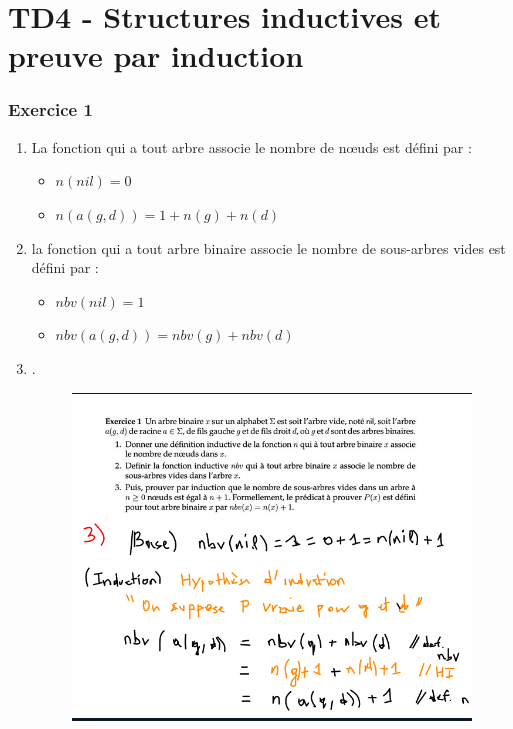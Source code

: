 \documentclass[a4paper, draft]{article}
\begin{document}
\part*{TD4 - Structures inductives et preuve par induction}
\section*{Exercice 1}
\begin{enumerate}
  \item La fonction qui a tout arbre associe le nombre de n\oe uds est défini par :
    \begin{itemize}
      \item $n(nil) = 0$
      \item $n(a(g,d)) = 1 + n(g) + n(d)$\\
    \end{itemize}
    \item la fonction qui a tout arbre binaire associe le nombre de sous-arbres vides est défini par :
    \begin{itemize}
      \item $nbv(nil) = 1$
      \item $nbv(a(g, d)) = nbv(g) + nbv(d)$\\
    \end{itemize}
  \item .
    \begin{figure}[!h]
      \includegraphics[scale = 0.5]{ex1.3}
      \end{figure}
\end{enumerate}
\end{document}
